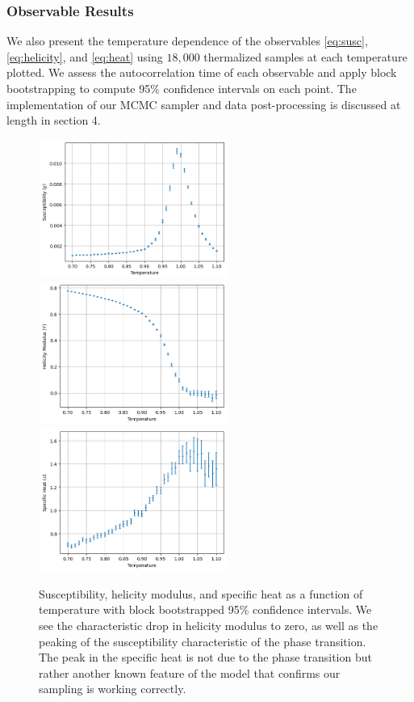 \documentclass[12pt]{article}
\begin{document}
\subsubsection{Observable Results}

We also present the temperature dependence of the observables \ref{eq:susc}, \ref{eq:helicity}, and \ref{eq:heat} using $18,000$ thermalized samples at each temperature plotted. We 
assess the autocorrelation time of each observable and apply block bootstrapping \cite{10.1214/aos/1176347265}
to compute 95\% confidence intervals on each point. The implementation of our MCMC sampler and data post-processing is discussed at length in section 4.

\begin{figure}
	\centering
	\includegraphics[width=0.55\textwidth]{figures/obs/susc.png}
	\includegraphics[width=0.55\textwidth]{figures/obs/helicity.png}
	\includegraphics[width=0.55\textwidth]{figures/obs/heat_capacity.png}
	\caption[Diagnostic observables]{Susceptibility, helicity modulus, and specific heat as a function of temperature with block bootstrapped 95\% confidence intervals.
	We see the characteristic drop in helicity modulus to zero, as well as the peaking of the susceptibility characteristic of the phase transition. The peak
	in the specific heat is not due to the phase transition but rather another known feature of the model that confirms our sampling is working correctly.}
	\label{fig:observables}
\end{figure}
\end{document}
